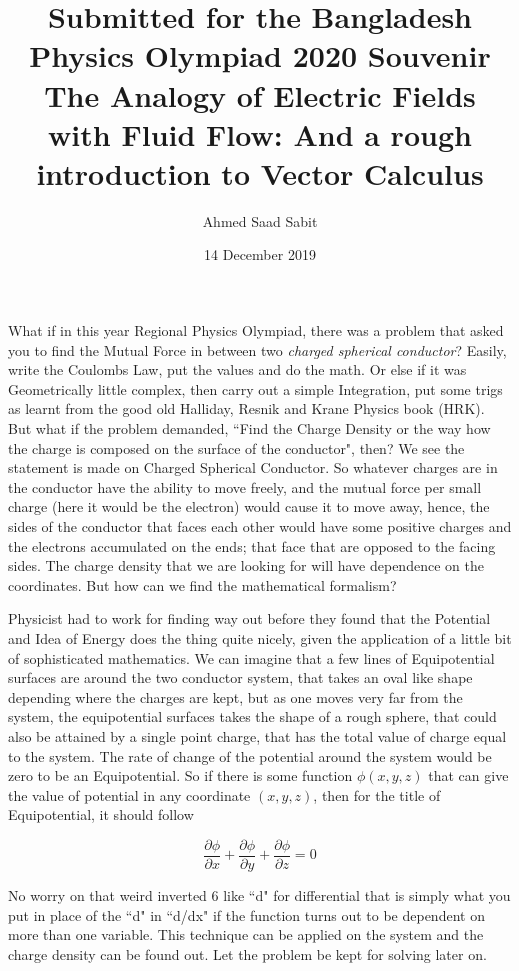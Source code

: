 \documentclass[11pt,a4paper]{article}
\author{Ahmed Saad Sabit}
\date{14 December 2019}
\title{{\small Submitted for the Bangladesh Physics Olympiad 2020 Souvenir } \vspace{1.7cm}\\
The Analogy of Electric Fields with Fluid Flow: And a rough introduction to Vector Calculus}
\begin{document}
\maketitle
What if in this year Regional Physics Olympiad, there was a problem that asked you to find the Mutual Force in between two \emph{charged spherical conductor}? Easily, write the Coulombs Law, put the values and do the math. Or else if it was Geometrically little complex, then carry out a simple Integration, put some trigs as learnt from the good old Halliday, Resnik and Krane Physics book (HRK). But what if the problem demanded, ``Find the Charge Density or the way how the charge is composed on the surface of the conductor", then? We see the statement is made on Charged Spherical Conductor. So whatever charges are in the conductor have the ability to move freely, and the mutual force per small charge (here it would be the electron) would cause it to move away, hence, the sides of the conductor that faces each other would have some positive charges and the electrons accumulated on the ends; that face that are opposed to the facing sides. The charge density that we are looking for will have dependence on the coordinates. But how can we find the mathematical formalism?

	Physicist had to work for finding way out before they found that the Potential and Idea of Energy does the thing quite nicely, given the application of a little bit of sophisticated mathematics. We can imagine that a few lines of Equipotential surfaces are around the two conductor system, that takes an oval like shape depending where the charges are kept, but as one moves very far from the system, the equipotential surfaces takes the shape of a rough sphere, that could also be attained by a single point charge, that has the total value of charge equal to the system. The rate of change of the potential around the system would be zero to be an Equipotential. So if there is some function $\phi(x,y,z)$ that can give the value of potential in any coordinate $(x,y,z)$, then for the title of Equipotential, it should follow
	
	\begin{equation}
	\frac{\partial \phi}{\partial x} +
	\frac{\partial \phi}{\partial y} +
	\frac{ \partial \phi}{\partial z} = 0
	\end{equation}

No worry on that weird inverted 6 like ``d" for differential that is simply what you put in place of the ``d" in ``d/dx" if the function turns out to be dependent on more than one variable.
 This technique can be applied on the system and the charge density can be found out. Let the problem be kept for solving later on.
 
\end{document}
